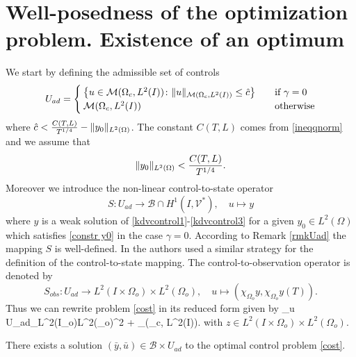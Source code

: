 \section{Well-posedness of the optimization problem. Existence of an optimum}\label{sec:ex opt}
We start by defining the admissible set of controls
$$U_{ad} = \begin{cases} \left\{u \in \mathcal{M}(\Omega_c, L^{2}(I))\colon \lVert u\rVert_{\mathcal{M}(\Omega_c, L^{2}(I))}\leq \hat c \right\} &\quad\mbox{if } \gamma = 0 \\
\mathcal{M}(\Omega_c, L^{2}(I)) & \quad \mbox{otherwise}
 \end{cases}$$
where $\hat c< \frac{C(T,L)}{T^{1/4}}-\lVert y_0\rVert_{L^2(\Omega)}$. The constant $C(T,L)$ comes from \eqref{ineqqnorm} and we assume that
\begin{equation}\label{constr y0}
\norm{y_0}_{L^2(\Omega)}< \frac{C(T,L)}{T^{1/4}}.
\end{equation}
Moreover we introduce the non-linear control-to-state operator
\begin{equation}
 S\colon U_{ad}\rightarrow \mathcal B\cap H^1(I,\mathcal V^\ast),\quad u\mapsto y
 \label{controltostate}
\end{equation}
where $y$ is a weak solution of \eqref{kdvcontrol1}-\eqref{kdvcontrol3} for a given $y_0\in L^2(\Omega)$ which satisfies
\eqref{constr y0} in the case $\gamma =0$. According to Remark \ref{rmkUad} the mapping $S$ is well-defined. In \cite{ClasonKaltenbacher13} the authors used a similar strategy for the definition of the control-to-state mapping. The control-to-observation operator is denoted by
\[
S_{obs}\colon U_{ad}\rightarrow L^2(I\times \Omega_{o})\times L^2(\Omega_{o}),\quad u\mapsto(\chi_{\Omega_{o}}y,\chi_{\Omega_{o}}y(T)).
\]
Thus we can rewrite problem \eqref{cost} in its reduced form given by
\be
\min_{u \in U_{ad}}_{L^2(I\times \Omega_{o})\times L^2(\Omega_{o})}^2 + \alpha {}_{(\Omega_{c}, L^{2}(I))}.
\label{red cost}
\ee
with $z\in L^2(I\times \Omega_{o})\times L^2(\Omega_{o})$.
\begin{proposition}
There exists a solution $(\bar y,\bar u) \in \mathcal B\times U_{ad}$ to the optimal control problem \eqref{cost}.
\end{proposition}
